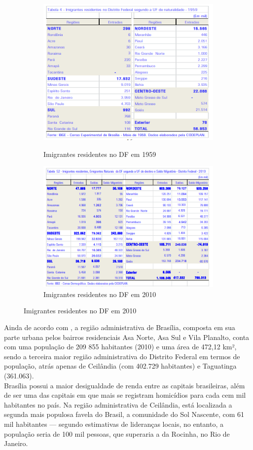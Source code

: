 \begin{figure}[h]
    \begin{subfigure}{.5\textwidth}
        \centering
        \includegraphics[width=.4\linewidth]{fig/imigrantes-1959}
        \label{table:imigrantes-1959}
        \caption{Imigrantes residentes no DF em 1959}
    \end{subfigure}

    \begin{subfigure}{.5\textwidth}
        \centering
        \includegraphics[width=.4\linewidth]{fig/imigrantes-2010}
        \caption{Imigrantes residentes no DF em 2010}
        \label{table:imigrantes-2010}
    \end{subfigure}
\end{figure}



Ainda de acordo com , a região administrativa de Brasília, composta em sua parte urbana pelos bairros residenciais Asa Norte, Asa Sul e Vila Planalto, conta com uma população de 209 855 habitantes (2010) e uma área de 472,12 km², sendo a terceira maior região administrativa do Distrito Federal em termos de população, atrás apenas de Ceilândia (com 402.729 habitantes) e Taguatinga (361.063).\\

Brasília possui a maior desigualdade de renda entre as capitais brasileiras, além de ser uma das capitais em que mais se registram homicídios para cada cem mil habitantes no país. Na região administrativa de Ceilândia, está localizada a segunda mais populosa favela do Brasil, a comunidade do Sol Nascente, com 61 mil habitantes — segundo estimativas de lideranças locais, no entanto, a população seria de 100 mil pessoas, que superaria a da Rocinha, no Rio de Janeiro.\\

